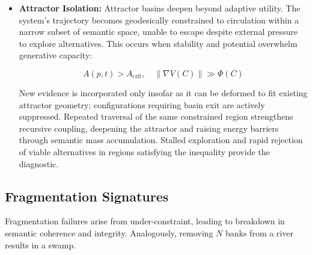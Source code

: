 \begin{itemize}
    \item \textbf{Attractor Isolation:} Attractor basins deepen beyond adaptive utility. The system's trajectory becomes geodesically constrained to circulation within a narrow subset of semantic space, unable to escape despite external pressure to explore alternatives. This occurs when stability and potential overwhelm generative capacity:

    \begin{equation}
    A(p,t) > A_{\text{crit}}, \quad \|\nabla V(C)\| \gg \Phi(C)
    \end{equation}

    New evidence is incorporated only insofar as it can be deformed to fit existing attractor geometry; configurations requiring basin exit are actively suppressed. Repeated traversal of the same constrained region strengthens recursive coupling, deepening the attractor and raising energy barriers through semantic mass accumulation. Stalled exploration and rapid rejection of viable alternatives in regions satisfying the inequality provide the diagnostic.

\end{itemize}


\subsection{Fragmentation Signatures}
\label{16.2.2:fragmentation_signatures}

Fragmentation failures arise from under-constraint, leading to breakdown in semantic coherence and integrity. Analogously, removing \(N\) banks from a river results in a swamp.

